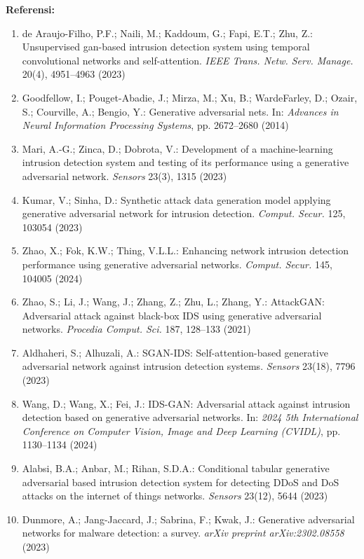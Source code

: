 \documentclass[a4paper]{article}
\begin{document}
\vspace{0.5cm}
\noindent\textbf{Referensi:}
\begin{enumerate}[leftmargin=1.2cm, itemsep=1pt, parsep=0pt]
    \item de Araujo-Filho, P.F.; Naili, M.; Kaddoum, G.; Fapi, E.T.; Zhu, Z.: Unsupervised gan-based intrusion detection system using temporal convolutional networks and self-attention. \textit{IEEE Trans. Netw. Serv. Manage.} 20(4), 4951--4963 (2023)
    \item Goodfellow, I.; Pouget-Abadie, J.; Mirza, M.; Xu, B.; WardeFarley, D.; Ozair, S.; Courville, A.; Bengio, Y.: Generative adversarial nets. In: \textit{Advances in Neural Information Processing Systems}, pp. 2672--2680 (2014)
    \item Mari, A.-G.; Zinca, D.; Dobrota, V.: Development of a machine-learning intrusion detection system and testing of its performance using a generative adversarial network. \textit{Sensors} 23(3), 1315 (2023)
    \item Kumar, V.; Sinha, D.: Synthetic attack data generation model applying generative adversarial network for intrusion detection. \textit{Comput. Secur.} 125, 103054 (2023)
    \item Zhao, X.; Fok, K.W.; Thing, V.L.L.: Enhancing network intrusion detection performance using generative adversarial networks. \textit{Comput. Secur.} 145, 104005 (2024)
    \item Zhao, S.; Li, J.; Wang, J.; Zhang, Z.; Zhu, L.; Zhang, Y.: AttackGAN: Adversarial attack against black-box IDS using generative adversarial networks. \textit{Procedia Comput. Sci.} 187, 128--133 (2021)
    \item Aldhaheri, S.; Alhuzali, A.: SGAN-IDS: Self-attention-based generative adversarial network against intrusion detection systems. \textit{Sensors} 23(18), 7796 (2023)
    \item Wang, D.; Wang, X.; Fei, J.: IDS-GAN: Adversarial attack against intrusion detection based on generative adversarial networks. In: \textit{2024 5th International Conference on Computer Vision, Image and Deep Learning (CVIDL)}, pp. 1130--1134 (2024)
    \item Alabsi, B.A.; Anbar, M.; Rihan, S.D.A.: Conditional tabular generative adversarial based intrusion detection system for detecting DDoS and DoS attacks on the internet of things networks. \textit{Sensors} 23(12), 5644 (2023)
    \item Dunmore, A.; Jang-Jaccard, J.; Sabrina, F.; Kwak, J.: Generative adversarial networks for malware detection: a survey. \textit{arXiv preprint arXiv:2302.08558} (2023)

\end{enumerate}
\end{document}
